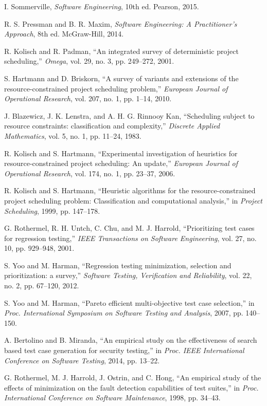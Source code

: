 \documentclass[journal]{IEEEtran}
\begin{document}
\begin{thebibliography}{1}
I. Sommerville, \emph{Software Engineering}, 10th ed. Pearson, 2015.

R. S. Pressman and B. R. Maxim, \emph{Software Engineering: A Practitioner's Approach}, 8th ed. McGraw-Hill, 2014.

R. Kolisch and R. Padman, ``An integrated survey of deterministic project scheduling,'' \emph{Omega}, vol. 29, no. 3, pp. 249--272, 2001.

S. Hartmann and D. Briskorn, ``A survey of variants and extensions of the resource-constrained project scheduling problem,'' \emph{European Journal of Operational Research}, vol. 207, no. 1, pp. 1--14, 2010.

J. Blazewicz, J. K. Lenstra, and A. H. G. Rinnooy Kan, ``Scheduling subject to resource constraints: classification and complexity,'' \emph{Discrete Applied Mathematics}, vol. 5, no. 1, pp. 11--24, 1983.

R. Kolisch and S. Hartmann, ``Experimental investigation of heuristics for resource-constrained project scheduling: An update,'' \emph{European Journal of Operational Research}, vol. 174, no. 1, pp. 23--37, 2006.

R. Kolisch and S. Hartmann, ``Heuristic algorithms for the resource-constrained project scheduling problem: Classification and computational analysis,'' in \emph{Project Scheduling}, 1999, pp. 147--178.

G. Rothermel, R. H. Untch, C. Chu, and M. J. Harrold, ``Prioritizing test cases for regression testing,'' \emph{IEEE Transactions on Software Engineering}, vol. 27, no. 10, pp. 929--948, 2001.

S. Yoo and M. Harman, ``Regression testing minimization, selection and prioritization: a survey,'' \emph{Software Testing, Verification and Reliability}, vol. 22, no. 2, pp. 67--120, 2012.

S. Yoo and M. Harman, ``Pareto efficient multi-objective test case selection,'' in \emph{Proc. International Symposium on Software Testing and Analysis}, 2007, pp. 140--150.

A. Bertolino and B. Miranda, ``An empirical study on the effectiveness of search based test case generation for security testing,'' in \emph{Proc. IEEE International Conference on Software Testing}, 2014, pp. 13--22.

G. Rothermel, M. J. Harrold, J. Ostrin, and C. Hong, ``An empirical study of the effects of minimization on the fault detection capabilities of test suites,'' in \emph{Proc. International Conference on Software Maintenance}, 1998, pp. 34--43.

\end{thebibliography}
\end{document}
